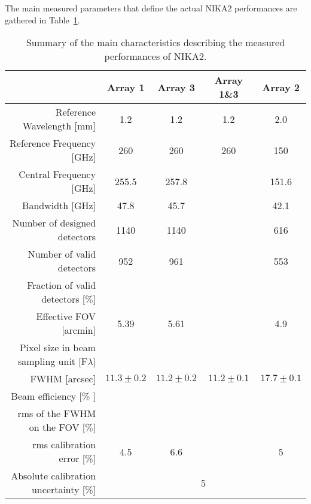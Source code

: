 The main measured parameters that define the actual NIKA2 performances are gathered in Table~\ref{nika2summary}.

\begin{table}[h]
  \caption{Summary of the main characteristics describing the measured performances of NIKA2.}
  \label{nika2summary}
  \begin{threeparttable}
    \begin{tabular}{|r|c|c|c|c|}
      \hline
      & Array 1 & Array 3  & Array 1\&3 & Array 2 \\
      \hline
      \hline
      Reference Wavelength  [mm]  &  1.2   &  1.2  & 1.2 & 2.0  \\
      Reference Frequency  [GHz]  &  260   &  260  & 260 & 150  \\
      Central Frequency [GHz]     &  255.5  &    257.8     &     &   151.6      \\
      Bandwidth         [GHz]     &   47.8  &     45.7     &     &    42.1      \\
      \hline
      Number of designed detectors       & 1140      &  1140    &    &    616      \\
      Number of valid detectors          &  952      &   961    &    &    553      \\
      Fraction of valid detectors [$\%$] &           &          &    &             \\
      Effective FOV\tnote{a}\hspace{1mm} [arcmin]    &   5.39    &   5.61    &    &   4.9      \\
      \hline
      Pixel size in beam sampling unit [F$\lambda$]  &    &   &    &   \\
      \hline
      FWHM\tnote{b}\hspace{1mm} [arcsec]  &  $11.3 \pm 0.2$   &  $11.2 \pm 0.2$  &   $11.2 \pm 0.1$  &  $17.7 \pm 0.1$   \\
      Beam efficiency\tnote{c}\hspace{1mm} [\% ]    &        &    &     &      \\
      rms of the FWHM on the FOV [$\%$]   &   &    &   &  \\
      \hline 
      rms calibration error [\%]            & 4.5  & 6.6  &   & 5 \\
      \hline
      Absolute calibration uncertainty [\%] &  \multicolumn{4}{|c|}{5} \\

\end{tabular}
\end{threeparttable}
\end{table}
